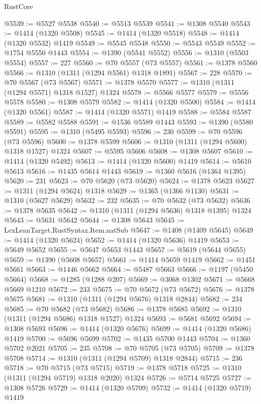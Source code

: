 \begin{lexlean}{RustCore}
\begin{coremodule}
@5539 := @5527 @5538
@5540 := @5513 @5539
@5541 := @1308 @5540
@5543 := @1414 (@1320 @5508)
@5545 := @1414 (@1320 @5518)
@5548 := @1414 (@1320 @5532) @1419
@5549 := @5545 @5548
@5550 := @5543 @5549
@5552 := @1754 @5550 @1443
@5554 := @1390 (@5541 @5552)
@5556 := @1310 (@5503 @5554)
@5557 := 227
@5560 := @70 @5557 (@73 @5557)
@5561 := @1378 @5560
@5566 := @1310 (@1311 (@1294 @5561) @1318 @1891)
@5567 := 228
@5570 := @70 @5567 (@73 @5567)
@5571 := @1378 @5570
@5577 := @1310 (@1311 (@1294 @5571) @1318 @1527) @1324
@5578 := @5566 @5577
@5579 := @5556 @5578
@5580 := @1308 @5579
@5582 := @1414 (@1320 @5500)
@5584 := @1414 (@1320 @5561)
@5587 := @1414 (@1320 @5571) @1419
@5588 := @5584 @5587
@5589 := @5582 @5588
@5591 := @1536 @5589 @1443
@5593 := @1390 (@5580 @5591)
@5595 := @1310 (@5495 @5593)
@5596 := 230
@5599 := @70 @5596 (@73 @5596)
@5600 := @1378 @5599
@5606 := @1310 (@1311 (@1294 @5600) @1318 @1527) @1324
@5607 := @5595 @5606
@5608 := @1308 @5607
@5610 := @1414 (@1320 @5492)
@5613 := @1414 (@1320 @5600) @1419
@5614 := @5610 @5613
@5616 := @1435 @5614 @1443
@5619 := @1360 @5616 (@1364 @1395)
@5620 := 231
@5623 := @70 @5620 (@73 @5620)
@5624 := @1378 @5623
@5627 := @1311 (@1294 @5624) @1318
@5629 := @1365 (@1366 @1130)
@5631 := @1310 (@5627 @5629)
@5632 := 232
@5635 := @70 @5632 (@73 @5632)
@5636 := @1378 @5635
@5642 := @1310 (@1311 (@1294 @5636) @1318 @1395) @1324
@5643 := @5631 @5642
@5644 := @1308 @5643
@5645 := LexLeanTarget.RustSyntax.Item.natSub
@5647 := @1408 (@1409 @5645)
@5649 := @1414 (@1320 @5624)
@5652 := @1414 (@1320 @5636) @1419
@5653 := @5649 @5652
@5655 := @5647 @5653 @1443
@5657 := @5619 (@5644 @5655)
@5659 := @1390 (@5608 @5657)
@5661 := @1414 @5659 @1419
@5662 := @1451 @5661
@5663 := @1446 @5662
@5664 := @5487 @5663
@5666 := @1197 (@5450 @5664)
@5668 := @1285 (@1288 @207)
@5669 := @3068 @1302
@5671 := @5668 @5669 @1210
@5672 := 233
@5675 := @70 @5672 (@73 @5672)
@5676 := @1378 @5675
@5681 := @1310 (@1311 (@1294 @5676) @1318 @2844)
@5682 := 234
@5685 := @70 @5682 (@73 @5682)
@5686 := @1378 @5685
@5692 := @1310 (@1311 (@1294 @5686) @1318 @1527) @1324
@5693 := @5681 @5692
@5694 := @1308 @5693
@5696 := @1414 (@1320 @5676)
@5699 := @1414 (@1320 @5686) @1419
@5700 := @5696 @5699
@5702 := @1435 @5700 @1443
@5704 := @1360 @5702 @2021
@5705 := 235
@5708 := @70 @5705 (@73 @5705)
@5709 := @1378 @5708
@5714 := @1310 (@1311 (@1294 @5709) @1318 @2844)
@5715 := 236
@5718 := @70 @5715 (@73 @5715)
@5719 := @1378 @5718
@5725 := @1310 (@1311 (@1294 @5719) @1318 @2020) @1324
@5726 := @5714 @5725
@5727 := @1308 @5726
@5729 := @1414 (@1320 @5709)
@5732 := @1414 (@1320 @5719) @1419

\end{coremodule}
\end{lexlean}
